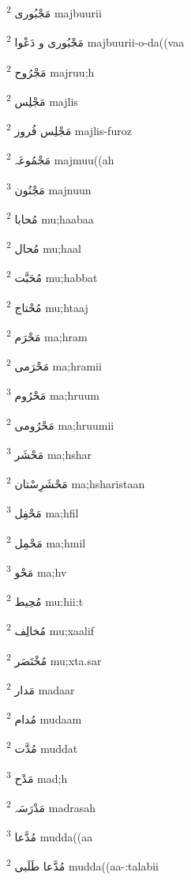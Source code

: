 \documentclass[12pt]{article}
\begin{document}
\begin{multicols}{5}
{\ur مَجْبُوری}   \textsuperscript{2} majbuurii

{\ur مَجْبُوری و دَعْوا}   \textsuperscript{2} majbuurii-o-da((vaa

{\ur مَجْرُوح}   \textsuperscript{2} majruu;h

{\ur مَجْلِس}   \textsuperscript{2} majlis

{\ur مَجْلِس فُروز}   \textsuperscript{2} majlis-furoz

{\ur مَجْمُوعَہ}   \textsuperscript{2} majmuu((ah

{\ur مَجْنُون}   \textsuperscript{3} majnuun

{\ur مُحابا}   \textsuperscript{2} mu;haabaa

{\ur مُحال}   \textsuperscript{2} mu;haal

{\ur مُحَبَّت}   \textsuperscript{2} mu;habbat

{\ur مُحْتاج}   \textsuperscript{2} mu;htaaj

{\ur مَحْرَم}   \textsuperscript{2} ma;hram

{\ur مَحْرَمی}   \textsuperscript{2} ma;hramii

{\ur مَحْرُوم}   \textsuperscript{3} ma;hruum

{\ur مَحْرُومی}   \textsuperscript{2} ma;hruumii

{\ur مَحْشَر}   \textsuperscript{3} ma;hshar

{\ur مَحْشَرِسْتان}   \textsuperscript{2} ma;hsharistaan

{\ur مَحْفِل}   \textsuperscript{3} ma;hfil

{\ur مَحْمِل}   \textsuperscript{2} ma;hmil

{\ur مَحْو}   \textsuperscript{3} ma;hv

{\ur مُحِیط}   \textsuperscript{2} mu;hii:t

{\ur مُخالِف}   \textsuperscript{2} mu;xaalif

{\ur مُخْتَصَر}   \textsuperscript{2} mu;xta.sar

{\ur مَدار}   \textsuperscript{2} madaar

{\ur مُدام}   \textsuperscript{2} mudaam

{\ur مُدَّت}   \textsuperscript{2} muddat

{\ur مَدْح}   \textsuperscript{3} mad;h

{\ur مَدْرَسَہ}   \textsuperscript{2} madrasah

{\ur مُدَّعا}   \textsuperscript{3} mudda((aa

{\ur مُدَّعا طَلَبی}   \textsuperscript{2} mudda((aa-:talabii


\end{multicols}
\end{document}
